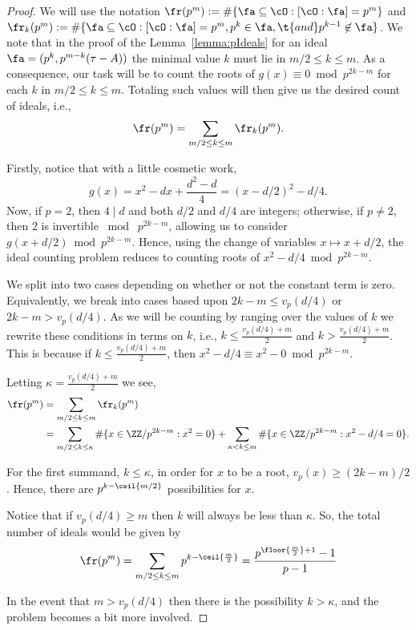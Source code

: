 \documentclass[11pt, proquest]{uwthesis}
\begin{document}
\begin{proof}
  We will use the notation $\fr(p^m) := \#\{\fa\subseteq \cO:[\cO:\fa]=p^m\}$ and $\fr_k(p^m):= \#\{\fa\subseteq \cO:[\cO:\fa]=p^m,p^k\in\fa, \t{ and } p^{k-1}\not\in\fa\}$.
    We note that in the proof of the Lemma~\ref{lemma:pIdeals} for an ideal $\fa = (p^k,p^{m-k}(\tau-A))$ the minimal value $k$ must lie in $m/2\leq k\leq m$.
    As a consequence, our task will be to count the roots of $g(x)\equiv 0\bmod p^{2k-m}$ for each $k$ in $m/2\leq k\leq m$.
  Totaling such values will then give us the desired count of ideals, i.e.,
  \[
  \fr(p^m) = \sum_{m/2\leq k\leq m} \fr_k(p^m).
  \]

  Firstly, notice that with a little cosmetic work,
  \[ g(x) = x^2-dx+\frac{d^2-d}{4} = (x-d/2)^2-d/4.
  \]
  Now, if $p=2$, then $4\mid d$ and both $d/2$ and $d/4$ are integers; otherwise, if $p\ne 2$, then $2$ is invertible $\bmod\; p^{2k-m}$, allowing us to consider $g(x+d/2)\bmod p^{2k-m}$.
  Hence, using the change of variables $x\mapsto x+d/2$, the ideal counting problem reduces to counting roots of $x^2-d/4\bmod p^{2k-m}$.

  We split into two cases depending on whether or not the constant term is zero.
  Equivalently, we break into cases based upon $2k-m\leq v_p(d/4)$ or $2k-m> v_p(d/4)$.
  As we will be counting by ranging over the values of $k$ we rewrite these conditions in terms on $k$, i.e., $k \leq \frac{v_p(d/4)+m}{2}$ and $k>\frac{v_p(d/4)+m}{2}$.
  This is because if $k \leq \frac{v_p(d/4)+m}{2}$, then $x^2 - d/4\equiv x^2 - 0\bmod p^{2k-m}$.

    Letting $\kappa = \frac{v_p(d/4)+m}{2}$ we see,
  \begin{align*}
  \fr(p^m) &= \sum_{m/2\leq k\leq m} \fr_k(p^m)\\
           &= \sum_{m/2\leq k\leq \kappa} \#\{x\in \ZZ/p^{2k-m}:x^2=0\} + \sum_{\kappa<k\leq m} \#\{x\in \ZZ/p^{2k-m}:x^2-d/4=0\}.
  \end{align*}

  For the first summand, $k\leq \kappa$, in order for $x$ to be a root, $v_p(x) \geq (2k-m)/2$.
  Hence, there are $p^{k-\ceil{m/2}}$ possibilities for $x$.

  Notice that if $v_p(d/4) \geq m$ then $k$ will always be less than $\kappa$.
  So, the total number of ideals would be given by
  \[
  \fr(p^m) =\sum_{m/2\leq k\leq m} p^{k-\ceil{\frac{m}{2}}} = \frac{p^{\floor{\frac{m}{2}}+1}-1}{p-1}
  \]

  In the event that $m>v_p(d/4)$ then there is the possibility $k>\kappa$, and the problem becomes a bit more involved.


\end{proof}
\end{document}
